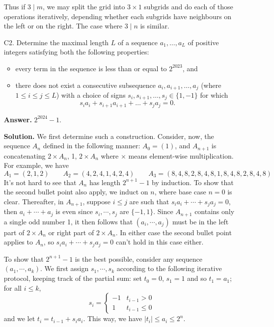 \documentclass[11pt,a4paper]{article}
\begin{document}
\begin{enumerate}
    	Thus if $3\mid m$, we may split the grid into $3\times 1$ subgrids and do each of those operations iteratively, 
    	depending whether each subgrids have neighbours on the left or on the right. 
    	The case where $3\mid n$ is similar. 
    	
    	\item [C2.]
    	Determine the maximal length $L$ of a sequence $a_1,\dots,a_L$ of positive integers satisfying both the following properties:
    	\begin{itemize}
    		\item every term in the sequence is less than or equal to $2^{2023}$, and
    		\item there does not exist a consecutive subsequence $a_i,a_{i+1},\dots,a_j$ (where $1\le i\le j\le L$) with a choice of signs $s_i,s_{i+1},\dots,s_j\in\{1,-1\}$ for which\[s_ia_i+s_{i+1}a_{i+1}+\dots+s_ja_j=0.\]
    	\end{itemize}
    	\textbf{Answer.} $2^{2024} - 1$. 
    	
    	\textbf{Solution. }
    	We first determine such a construction. 
    	Consider, now, the sequence $A_n$ defined in the following manner: 
    	$A_0=(1)$, and $A_{n+1}$ is concatenating $2 \times A_n$, 1, $2\times A_n$ 
    	where $\times$ means element-wise multiplication. 
    	For example, we have 
    	\[
    	A_1 = (2, 1, 2)\qquad A_2 = (4, 2, 4, 1, 4, 2, 4)
    	\qquad A_3 = (8, 4, 8, 2, 8, 4, 8, 1,8, 4, 8, 2, 8, 4, 8)
    	\]
    	It's not hard to see that $A_n$ has length $2^{n + 1} - 1$ by induction. 
    	To show that the second bullet point also apply, we induct on $n$, where base case $n = 0$ is clear. 
    	Thereafter, in $A_{n + 1}$, 
    	suppose $i\le j$ are such that 
    	$s_ia_i + \cdots+ s_ja_j = 0$, 
    	then $a_i + \cdots + a_j$ is even since $s_i, \cdots, s_j$ are $\{-1, 1\}$. 
    	Since $A_{n + 1}$ contains only a single odd number 1, 
    	it then follows that $(a_i, \cdots, a_j)$ must be in the left part of 
    	$2 \times A_n$ or right part of $2\times A_n$. 
    	In either case the second bullet point applies to $A_n$, 
    	so $s_ia_i + \cdots+ s_ja_j = 0$ can't hold in this case either. 
    	
    	To show that $2^{n + 1} - 1$ is the best possible, 
    	consider any sequence $(a_1, \cdots, a_k)$. 
    	We first assign $s_1, \cdots, s_k$ according to the following iterative protocol, 
    	keeping track of the partial sum: 
    	set $t_0 = 0$, $s_1 = 1$ and so $t_1 = a_1$; 
    	for all $i\le k$, 
    	\[
    	s_i = 
    	\begin{cases}
    		-1 & t_{i-1} > 0\\
    		1 & t_{i-1}\le 0
    	\end{cases}
    	\]
    	and we let $t_i = t_{i-1} + s_ia_i$. 
    	This way, we have $|t_i|\le a_i\le 2^n$. 
    	

\end{enumerate}
\end{document}
